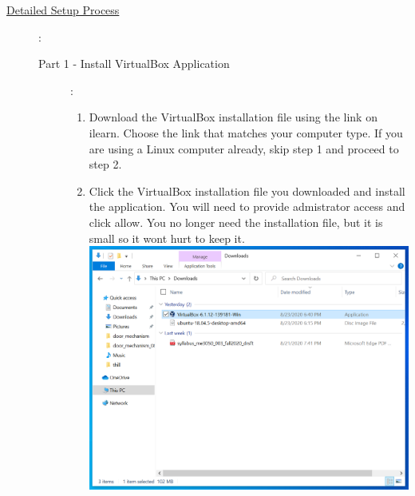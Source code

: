 \documentclass[12pt]{article}
\begin{document}
\begin{description}
			
                    
  

\newpage

\item[\underline{Detailed Setup Process}]: 

\begin{description} 
	

\item [Part 1 - Install VirtualBox Application]: \vspace{0mm}\\ 


\begin{enumerate}[label=\alph*)]
	
	\item Download the VirtualBox installation file using the link on ilearn. Choose the link that matches your computer type. If you are using a Linux computer already, skip step 1 and proceed to step 2. \vspace{5mm}
	
	\item Click the VirtualBox installation file you downloaded and install the application. You will need to provide admistrator access and click allow. You no longer need the installation file, but it is small so it wont hurt to keep it. \vspace{5mm} \\
	
	\hspace*{-2.5cm}\includegraphics[scale=.6]{Capture1.png}\\


\end{enumerate}
\end{description}
\end{description}
\end{document}

